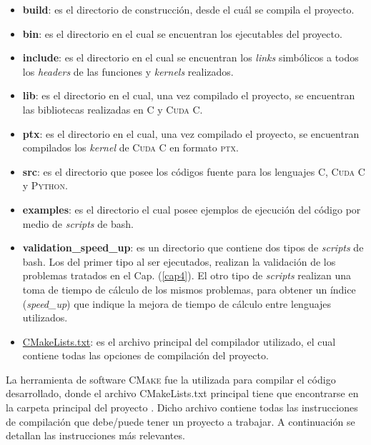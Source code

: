 \begin{itemize}
	\item \textbf{build}: es el directorio de construcción, desde el cuál se compila el proyecto.
	
	\item \textbf{bin}: es el directorio en el cual se encuentran los ejecutables del proyecto.
	
	\item \textbf{include}: es el directorio en el cual se encuentran los \textit{links} simbólicos a todos los \textit{headers} de las funciones y \textit{kernels} realizados.
	
	\item \textbf{lib}: es el directorio en el cual, una vez compilado el proyecto, se encuentran las bibliotecas realizadas en \textsc{C} y \textsc{Cuda C}.
	
	\item \textbf{ptx}: es el directorio en el cual, una vez compilado el proyecto, se encuentran compilados los \textit{kernel} de \textsc{Cuda C} en formato \textsc{ptx}.	
	
	\item \textbf{src}: es el directorio que posee los códigos fuente para los lenguajes \textsc{C}, \textsc{Cuda C} y \textsc{Python}.
	
	\item \textbf{examples}: es el directorio el cual posee ejemplos de ejecución del código por medio de \textit{scripts} de bash.
	
	\item \textbf{validation\_speed\_up}: es un directorio que contiene dos tipos de \textit{scripts} de bash. Los del primer tipo al ser ejecutados, realizan la validación de los problemas tratados en el Cap. (\ref{cap4}). El otro tipo de \textit{scripts} realizan una toma de tiempo de cálculo de los mismos problemas, para obtener un índice (\textit{speed\_up}) que indique la mejora de tiempo de cálculo entre lenguajes utilizados. 
	
	\item \underline{CMakeLists.txt}: es el archivo principal del compilador utilizado, el cual contiene todas las opciones de compilación del proyecto.
	
\end{itemize}


La herramienta de software \textsc{CMake} fue la utilizada para compilar el código desarrollado,  donde el archivo CMakeLists.txt principal tiene que encontrarse en la carpeta principal del proyecto \cite{cmake:2020:kitware}. Dicho archivo contiene todas las instrucciones de compilación que debe/puede tener un proyecto a trabajar. A continuación se detallan las instrucciones más relevantes.


